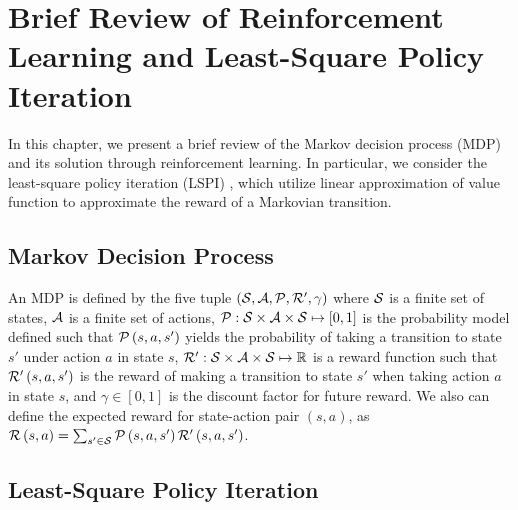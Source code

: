 \chapter{Brief Review of Reinforcement Learning and Least-Square Policy Iteration}\label{cha: Brief Review of Reinforcement Learning and Least-Square Policy Iteration}

In this chapter, we present a brief review of the Markov decision process (MDP) and its solution through reinforcement learning. In particular, we consider the least-square policy iteration (LSPI) \cite{lagoudakis:2003}, which utilize linear approximation of value function to approximate the reward of a Markovian transition.

\section{Markov Decision Process}

An MDP is defined by the five tuple $\left(\mathcal{S},\mathcal{A},\mathcal{P},\mathcal{R}',\gamma\right)$ where $\mathcal{S}$ is a finite set of states, $\mathcal{A}$ is a finite set of actions, $\mathcal{P}:\mathcal{S}\times\mathcal{A}\times\mathcal{S}\mapsto\left[0,1\right]$ is the probability model defined such that $\mathcal{P}\left(s,a,s'\right)$ yields the probability of taking a transition to state $s'$ under action $a$ in state $s$, $\mathcal{R}':\mathcal{S}\times\mathcal{A}\times\mathcal{S}\mapsto\mathbb{R}$ is a reward function such that $\mathcal{R}'\left(s,a,s'\right)$ is the reward of making a transition to state $s'$ when taking action $a$ in state $s$, and $\gamma\in\left[0,1\right]$ is the discount factor for future reward. We also can define the expected reward for state-action pair $\left(s,a\right)$, as $\mathcal{R}\left(s,a\right)=\sum_{s'\in\mathcal{S}}\mathcal{P}\left(s,a,s'\right)\mathcal{R}'\left(s,a,s'\right)$.

\section{Least-Square Policy Iteration}

